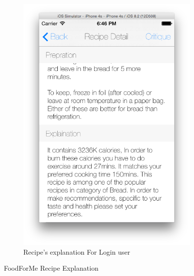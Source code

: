 \begin{figure}[h]
\begin{subfigure}{.49\textwidth}
		\includegraphics[width=.9\linewidth]{figures/ch4_app_screen_shots/recipe_detail/recommended_recipe_explaination/recommended_recipe_explaination_1.png}
		\caption{Recipe's explanation For Login user}
		\label{fig:foodforme_recipe_explanation_1}
	\end{subfigure}
	\caption{FoodForMe Recipe Explanation}
	\label{fig:foodforme_recipe_explanation}
\end{figure}

